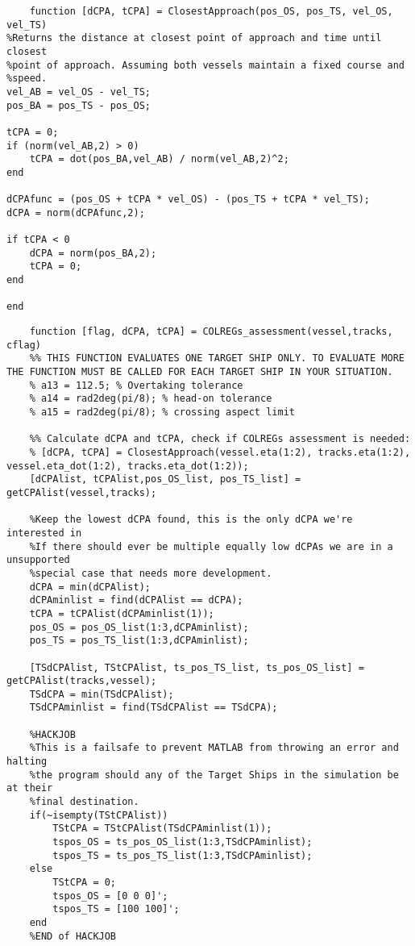 \clearpage
\begin{lstlisting}
    function [dCPA, tCPA] = ClosestApproach(pos_OS, pos_TS, vel_OS, vel_TS)
%Returns the distance at closest point of approach and time until closest
%point of approach. Assuming both vessels maintain a fixed course and
%speed.
vel_AB = vel_OS - vel_TS;
pos_BA = pos_TS - pos_OS;

tCPA = 0;
if (norm(vel_AB,2) > 0)
    tCPA = dot(pos_BA,vel_AB) / norm(vel_AB,2)^2;
end

dCPAfunc = (pos_OS + tCPA * vel_OS) - (pos_TS + tCPA * vel_TS);
dCPA = norm(dCPAfunc,2);

if tCPA < 0
    dCPA = norm(pos_BA,2);
    tCPA = 0;
end

end
\end{lstlisting}

\clearpage
\begin{lstlisting}
    function [flag, dCPA, tCPA] = COLREGs_assessment(vessel,tracks, cflag)
    %% THIS FUNCTION EVALUATES ONE TARGET SHIP ONLY. TO EVALUATE MORE THE FUNCTION MUST BE CALLED FOR EACH TARGET SHIP IN YOUR SITUATION.
    % a13 = 112.5; % Overtaking tolerance
    % a14 = rad2deg(pi/8); % head-on tolerance
    % a15 = rad2deg(pi/8); % crossing aspect limit
    
    %% Calculate dCPA and tCPA, check if COLREGs assessment is needed:
    % [dCPA, tCPA] = ClosestApproach(vessel.eta(1:2), tracks.eta(1:2), vessel.eta_dot(1:2), tracks.eta_dot(1:2));
    [dCPAlist, tCPAlist,pos_OS_list, pos_TS_list] = getCPAlist(vessel,tracks);
    
    %Keep the lowest dCPA found, this is the only dCPA we're interested in
    %If there should ever be multiple equally low dCPAs we are in a unsupported
    %special case that needs more development.
    dCPA = min(dCPAlist);
    dCPAminlist = find(dCPAlist == dCPA);
    tCPA = tCPAlist(dCPAminlist(1));
    pos_OS = pos_OS_list(1:3,dCPAminlist);
    pos_TS = pos_TS_list(1:3,dCPAminlist);
    
    [TSdCPAlist, TStCPAlist, ts_pos_TS_list, ts_pos_OS_list] = getCPAlist(tracks,vessel);
    TSdCPA = min(TSdCPAlist);
    TSdCPAminlist = find(TSdCPAlist == TSdCPA);
    
    %HACKJOB
    %This is a failsafe to prevent MATLAB from throwing an error and halting
    %the program should any of the Target Ships in the simulation be at their
    %final destination.
    if(~isempty(TStCPAlist))
        TStCPA = TStCPAlist(TSdCPAminlist(1));
        tspos_OS = ts_pos_OS_list(1:3,TSdCPAminlist);
        tspos_TS = ts_pos_TS_list(1:3,TSdCPAminlist);
    else
        TStCPA = 0;
        tspos_OS = [0 0 0]';
        tspos_TS = [100 100]';
    end
    %END of HACKJOB
    

\end{lstlisting}
